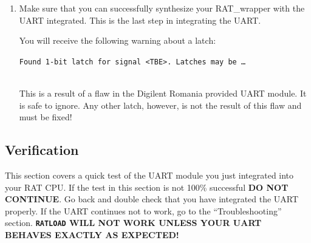 \documentclass[notitlepage]{article}
\newcommand{\warningsign}{\fontencoding{U}\fontfamily{futs}\Large\selectfont\char 66\relax}
\begin{document}
\begin {enumerate}
\begin{verbatim}
outputs: process(CLK) begin
   if (rising_edge(CLK)) then
      s_d_strb <= '0';
      s_d_conf <= '0';
      if (S_IO_OE = '1') then
         if (s_port_id = LEDS_ID) then
            LEDS <= s_output_port;
         elsif (s_port_id = UART_OUT_ID) then
            s_db_from_rat <= s_output_port;
            s_d_strb <= '1';
            s_d_conf <= '1';
         end if;
      end if;
   end if;
end process outputs;
\end{verbatim}

\item Make sure that you can successfully synthesize your RAT\_wrapper with the UART integrated. This is the last step in integrating the UART.
\begin{infobox}
  \textbf{{\warningsign}} You will receive the following warning about a latch:\\
    \centerline{\texttt{Found 1-bit latch for signal \textless TBE\textgreater. Latches may be \ldots}}\\
    This is a result of a flaw in the Digilent Romania provided UART module. It is safe to ignore. Any other latch, however, is not the result of this flaw and must be fixed!
\end{infobox}
\end{enumerate}

\subsection{Verification}
This section covers a quick test of the UART module you just integrated into your RAT CPU. If the test in this section is not 100\% successful \textbf{DO NOT CONTINUE}. Go back and double check that you have integrated the UART properly. If the UART continues not to work, go to the ``Troubleshooting'' section. \textbf{\texttt{RATLOAD} WILL NOT WORK UNLESS YOUR UART BEHAVES EXACTLY AS EXPECTED!}
\end{document}
